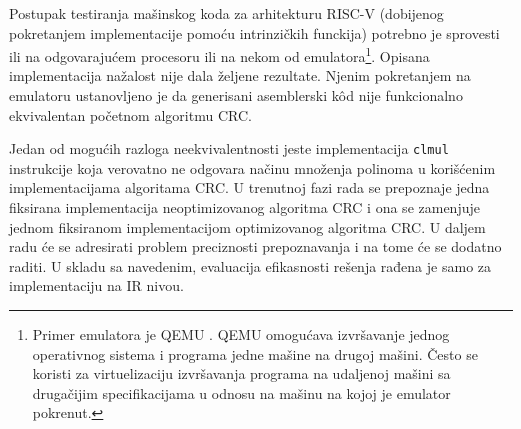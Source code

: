 \documentclass[12pt,oneside]{memoir}
\begin{document}

Postupak testiranja mašinskog koda za arhitekturu RISC-V (dobijenog pokretanjem implementacije pomoću intrinzičkih funckija) potrebno je sprovesti ili na odgovarajućem procesoru ili na nekom od emulatora\footnote{Primer emulatora je QEMU \cite{qemu}. QEMU omogućava izvršavanje jednog operativnog sistema i programa jedne mašine na drugoj mašini. Često se koristi za virtuelizaciju izvršavanja programa na udaljenoj mašini sa drugačijim specifikacijama u odnosu na mašinu na kojoj je emulator pokrenut.}. Opisana implementacija nažalost nije dala željene rezultate. Njenim pokretanjem na emulatoru ustanovljeno je da generisani asemblerski k\^od nije funkcionalno ekvivalentan početnom algoritmu CRC. 

Jedan od mogućih razloga neekvivalentnosti jeste implementacija \texttt{clmul} instrukcije koja verovatno ne odgovara načinu množenja polinoma u korišćenim implementacijama algoritama CRC. U trenutnoj fazi rada se prepoznaje jedna fiksirana implementacija neoptimizovanog algoritma CRC i ona se zamenjuje jednom fiksiranom implementacijom optimizovanog algoritma CRC. U daljem radu će se adresirati problem preciznosti prepoznavanja i na tome će se dodatno raditi.
U skladu sa navedenim, evaluacija efikasnosti rešenja rađena je samo za implementaciju na IR nivou.
\end{document}
